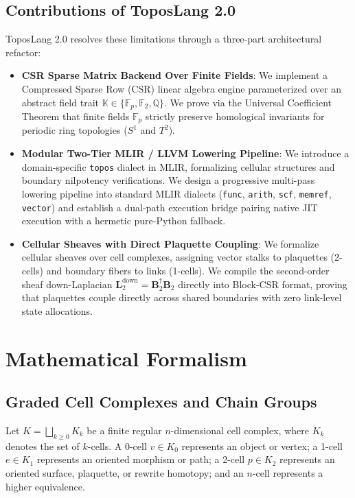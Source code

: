 \documentclass[conference]{IEEEtran}
\begin{document}
\subsection{Contributions of ToposLang 2.0}
ToposLang 2.0 resolves these limitations through a three-part architectural refactor:
\begin{itemize}
    \item \textbf{CSR Sparse Matrix Backend Over Finite Fields}: We implement a Compressed Sparse Row (CSR) linear algebra engine parameterized over an abstract field trait $\mathbb{K} \in \{\mathbb{F}_p, \mathbb{F}_2, \mathbb{Q}\}$. We prove via the Universal Coefficient Theorem that finite fields $\mathbb{F}_p$ strictly preserve homological invariants for periodic ring topologies ($S^1$ and $T^2$).
    \item \textbf{Modular Two-Tier MLIR / LLVM Lowering Pipeline}: We introduce a domain-specific \texttt{topos} dialect in MLIR, formalizing cellular structures and boundary nilpotency verifications. We design a progressive multi-pass lowering pipeline into standard MLIR dialects (\texttt{func}, \texttt{arith}, \texttt{scf}, \texttt{memref}, \texttt{vector}) and establish a dual-path execution bridge pairing native JIT execution with a hermetic pure-Python fallback.
    \item \textbf{Cellular Sheaves with Direct Plaquette Coupling}: We formalize cellular sheaves over cell complexes, assigning vector stalks to plaquettes (2-cells) and boundary fibers to links (1-cells). We compile the second-order sheaf down-Laplacian $\mathbf{L}_2^{\text{down}} = \mathbf{B}_2^\dagger \mathbf{B}_2$ directly into Block-CSR format, proving that plaquettes couple directly across shared boundaries with zero link-level state allocations.
\end{itemize}

\section{Mathematical Formalism}
\label{sec:math}

\subsection{Graded Cell Complexes and Chain Groups}
Let $K = \bigsqcup_{k \ge 0} K_k$ be a finite regular $n$-dimensional cell complex, where $K_k$ denotes the set of $k$-cells. A 0-cell $v \in K_0$ represents an object or vertex; a 1-cell $e \in K_1$ represents an oriented morphism or path; a 2-cell $p \in K_2$ represents an oriented surface, plaquette, or rewrite homotopy; and an $n$-cell represents a higher equivalence.
\end{document}
